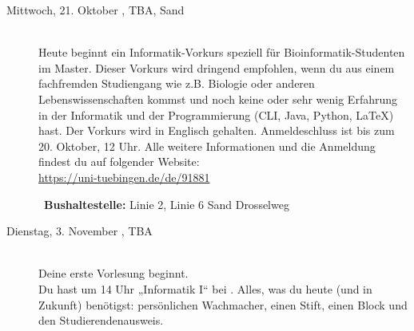 \begin{description}
	\ifsommersemester
	\fi

\fi

\ifmaster
    \ifbinfo
        \item[Mittwoch, 21. Oktober \YEAR, TBA, Sand]\ \\
            Heute beginnt ein Informatik-Vorkurs speziell für Bioinformatik-Studenten im Master. Dieser Vorkurs wird dringend empfohlen, wenn du aus einem fachfremden Studiengang wie z.B. Biologie oder anderen Lebenswissenschaften kommst und noch keine oder sehr wenig Erfahrung in der Informatik und der Programmierung (CLI, Java, Python, \LaTeX) hast. Der Vorkurs wird in Englisch gehalten. Anmeldeschluss ist bis zum 20. Oktober, 12 Uhr. Alle weitere Informationen und die Anmeldung findest du auf folgender Website: \\ \url{https://uni-tuebingen.de/de/91881}

        ~\textbf{Bushaltestelle:} Linie 2, Linie 6 Sand Drosselweg
    \fi
\fi

\ifbachelor
    \iflehramt
        \item[Dienstag, 3. November \YEAR, TBA]\ \\
            Deine erste Vorlesung beginnt. \\
            Du hast um 14 Uhr „Informatik I“ bei \Infoprof.
            Alles, was du heute (und in Zukunft) benötigst: persönlichen Wachmacher, einen Stift, einen Block und den Studierendenausweis.


\end{description}
